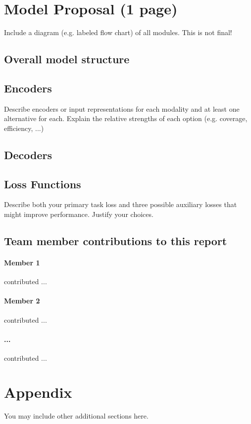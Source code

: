 \documentclass{article} %
\begin{document}
\clearpage
\section{Model Proposal (1 page)}
Include a diagram (e.g. labeled flow chart) of all modules.  This is not final!

\subsection{ Overall model structure }

\subsection{ Encoders }
Describe encoders or input representations for each modality and at least one alternative for each.  Explain the relative strengths of each option (e.g. coverage, efficiency, ...)

\subsection{ Decoders }

\subsection{ Loss Functions }
Describe both your primary task loss and three possible auxiliary losses that might improve performance.  Justify your choices.

\clearpage
\subsection{Team member contributions to this report}
\paragraph{Member 1} contributed ...

\paragraph{Member 2} contributed ...

\paragraph{...} contributed ...





\appendix
\section{Appendix}
You may include other additional sections here.
\end{document}
